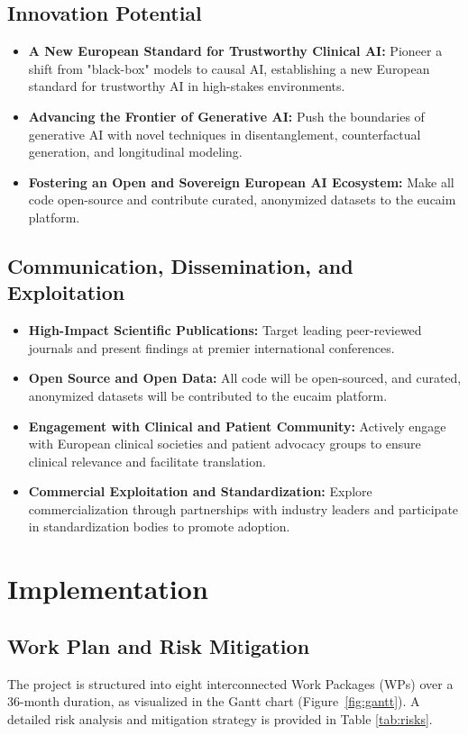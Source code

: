 \documentclass[11pt, a4paper]{article}
\begin{document}
\subsection{Innovation Potential}
\begin{itemize}
    \item \textbf{A New European Standard for Trustworthy Clinical AI:} Pioneer a shift from "black-box" models to causal AI, establishing a new European standard for trustworthy AI in high-stakes environments.
    \item \textbf{Advancing the Frontier of Generative AI:} Push the boundaries of generative AI with novel techniques in disentanglement, counterfactual generation, and longitudinal modeling.
    \item \textbf{Fostering an Open and Sovereign European AI Ecosystem:} Make all code open-source and contribute curated, anonymized datasets to the \gls{eucaim} platform.
\end{itemize}

\subsection{Communication, Dissemination, and Exploitation}
\begin{itemize}
    \item \textbf{High-Impact Scientific Publications:} Target leading peer-reviewed journals and present findings at premier international conferences.
    \item \textbf{Open Source and Open Data:} All code will be open-sourced, and curated, anonymized datasets will be contributed to the \gls{eucaim} platform.
    \item \textbf{Engagement with Clinical and Patient Community:} Actively engage with European clinical societies and patient advocacy groups to ensure clinical relevance and facilitate translation.
    \item \textbf{Commercial Exploitation and Standardization:} Explore commercialization through partnerships with industry leaders and participate in standardization bodies to promote adoption.
\end{itemize}

\section{Implementation}

\subsection{Work Plan and Risk Mitigation}
The project is structured into eight interconnected Work Packages (WPs) over a 36-month duration, as visualized in the Gantt chart (Figure~\ref{fig:gantt}). A detailed risk analysis and mitigation strategy is provided in Table \ref{tab:risks}.
\end{document}
